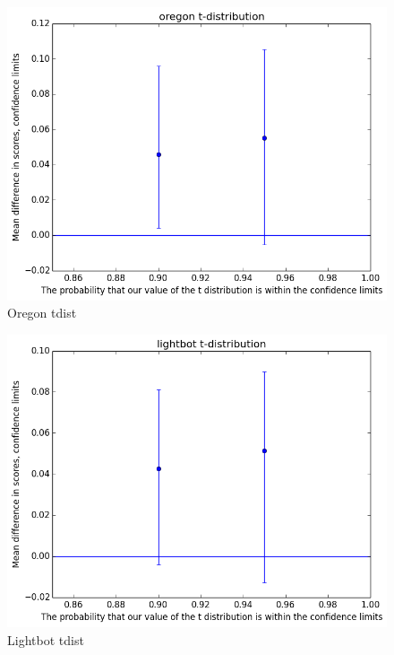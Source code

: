 			\begin{figure}[h] 
				\centering 
				\includegraphics[height=0.33\textheight]{oregon_tdist.png} 
				\caption{Oregon tdist}
			\end{figure}
			\begin{figure}[h] 
				\centering 
				\includegraphics[height=0.33\textheight]{lightbot_tdist.png} 
				\caption{Lightbot tdist}
			\end{figure}
